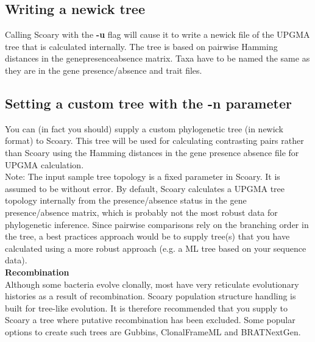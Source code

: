 \documentclass{article}
\begin{document}
    \subsection{Writing a newick tree}
      Calling Scoary with the \textbf{-u} flag will cause it to write a newick file of the UPGMA tree that is calculated internally. The tree is based on pairwise Hamming distances in the gene\textunderscore presence\textunderscore absence matrix. Taxa have to be named the same as they are in the gene presence/absence and trait files. \\

    \subsection{Setting a custom tree with the -n parameter}
      You can (in fact you should) supply a custom phylogenetic tree (in newick format) to Scoary. This tree will be used for calculating contrasting pairs rather than Scoary using the Hamming distances in the gene presence absence file for UPGMA calculation. \\

      Note: The input sample tree topology is a fixed parameter in Scoary. It is assumed to be without error. By default, Scoary calculates a UPGMA tree topology internally from the presence/absence status in the gene presence/absence matrix, which is probably not the most robust data for phylogenetic inference. Since pairwise comparisons rely on the branching order in the tree, a best practices approach would be to supply tree(s) that you have calculated using a more robust approach (e.g. a ML tree based on your sequence data).\\

      \textbf{Recombination}\\
      Although some bacteria evolve clonally, most have very reticulate evolutionary histories as a result of recombination. Scoary population structure handling is built for tree-like evolution. It is therefore recommended that you supply to Scoary a tree where putative recombination has been excluded. Some popular options to create such trees are Gubbins, ClonalFrameML and BRATNextGen. \\
\end{document}
